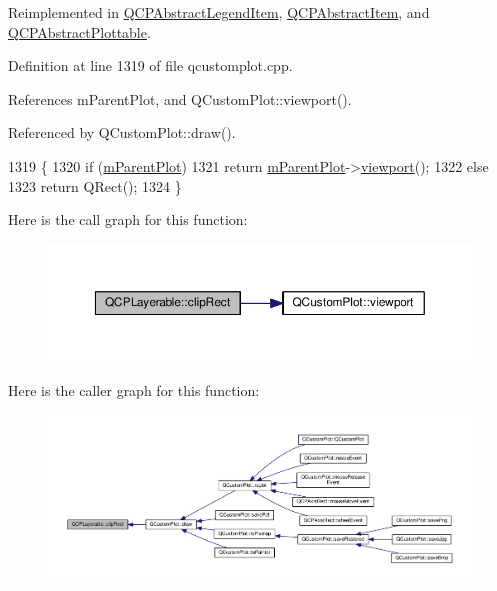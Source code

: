 Reimplemented in \hyperlink{class_q_c_p_abstract_legend_item_abcb540c331b49ef7ee0ea1abbd0dcac3}{Q\+C\+P\+Abstract\+Legend\+Item}, \hyperlink{class_q_c_p_abstract_item_a538e25ff8856534582f5b2b400a46405}{Q\+C\+P\+Abstract\+Item}, and \hyperlink{class_q_c_p_abstract_plottable_ac01960b0827913922f5364d559c124ed}{Q\+C\+P\+Abstract\+Plottable}.



Definition at line 1319 of file qcustomplot.\+cpp.



References m\+Parent\+Plot, and Q\+Custom\+Plot\+::viewport().



Referenced by Q\+Custom\+Plot\+::draw().


\begin{DoxyCode}
1319                                    \{
1320   \textcolor{keywordflow}{if} (\hyperlink{class_q_c_p_layerable_aa2a528433e44db02b8aef23c1f9f90ed}{mParentPlot})
1321     \textcolor{keywordflow}{return} \hyperlink{class_q_c_p_layerable_aa2a528433e44db02b8aef23c1f9f90ed}{mParentPlot}->\hyperlink{class_q_custom_plot_a953ecdbc28018e7e84cb6213ad3d88c2}{viewport}();
1322   \textcolor{keywordflow}{else}
1323     \textcolor{keywordflow}{return} QRect();
1324 \}
\end{DoxyCode}


Here is the call graph for this function\+:\nopagebreak
\begin{figure}[H]
\begin{center}
\leavevmode
\includegraphics[width=350pt]{class_q_c_p_layerable_a07a8f746640c3704b09910df297afcba_cgraph}
\end{center}
\end{figure}




Here is the caller graph for this function\+:\nopagebreak
\begin{figure}[H]
\begin{center}
\leavevmode
\includegraphics[width=350pt]{class_q_c_p_layerable_a07a8f746640c3704b09910df297afcba_icgraph}
\end{center}
\end{figure}


